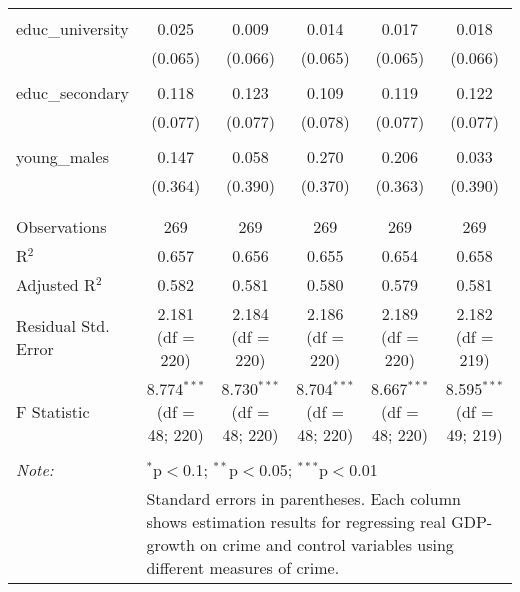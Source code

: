 \begin{table}[!htbp]
\begin{tabular}{@{\extracolsep{5pt}}lccccc}
  & & & & & \\ 
 educ\_university & 0.025 & 0.009 & 0.014 & 0.017 & 0.018 \\ 
  & (0.065) & (0.066) & (0.065) & (0.065) & (0.066) \\ 
  & & & & & \\ 
 educ\_secondary & 0.118 & 0.123 & 0.109 & 0.119 & 0.122 \\ 
  & (0.077) & (0.077) & (0.078) & (0.077) & (0.077) \\ 
  & & & & & \\ 
 young\_males & 0.147 & 0.058 & 0.270 & 0.206 & 0.033 \\ 
  & (0.364) & (0.390) & (0.370) & (0.363) & (0.390) \\ 
  & & & & & \\ 
\hline \\[-1.8ex] 
Observations & 269 & 269 & 269 & 269 & 269 \\ 
R$^{2}$ & 0.657 & 0.656 & 0.655 & 0.654 & 0.658 \\ 
Adjusted R$^{2}$ & 0.582 & 0.581 & 0.580 & 0.579 & 0.581 \\ 
Residual Std. Error & 2.181 (df = 220) & 2.184 (df = 220) & 2.186 (df = 220) & 2.189 (df = 220) & 2.182 (df = 219) \\ 
F Statistic & 8.774$^{***}$ (df = 48; 220) & 8.730$^{***}$ (df = 48; 220) & 8.704$^{***}$ (df = 48; 220) & 8.667$^{***}$ (df = 48; 220) & 8.595$^{***}$ (df = 49; 219) \\ 
\hline 
\hline \\[-1.8ex] 
\textit{Note:}  & \multicolumn{5}{l}{$^{*}$p$<$0.1; $^{**}$p$<$0.05; $^{***}$p$<$0.01} \\ 
 & \multicolumn{5}{l}{Standard errors in parentheses. Each column shows estimation results for regressing real GDP-growth on crime and control variables using different measures of crime.} \\ 
\end{tabular} 
\end{table} 
